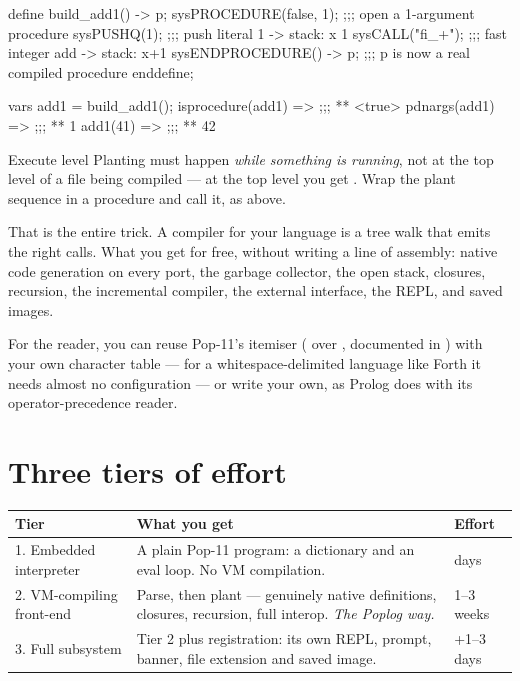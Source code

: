 \begin{pop}
define build_add1() -> p;
    sysPROCEDURE(false, 1);      ;;; open a 1-argument procedure
        sysPUSHQ(1);             ;;;   push literal 1    -> stack: x 1
        sysCALL("fi_+");         ;;;   fast integer add  -> stack: x+1
    sysENDPROCEDURE() -> p;      ;;; p is now a real compiled procedure
enddefine;

vars add1 = build_add1();
isprocedure(add1) =>          ;;; ** <true>
pdnargs(add1)     =>          ;;; ** 1
add1(41)          =>          ;;; ** 42
\end{pop}

\begin{callout}{Execute level}
Planting must happen \emph{while something is running}, not at the top level
of a file being compiled --- at the top level you get
. Wrap the plant sequence in a
procedure and call it, as above.
\end{callout}

That is the entire trick. A compiler for your language is a tree walk that
emits the right  calls. What you get for free, without writing
a line of assembly: native code generation on every port, the garbage
collector, the open stack, closures, recursion, the incremental compiler, the
external interface, the REPL, and saved images.

For the reader, you can reuse Pop-11's itemiser ( over
, documented in ) with your own character
table --- for a whitespace-delimited language like Forth it needs almost no
configuration --- or write your own, as Prolog does with its
operator-precedence reader.

\section{Three tiers of effort}

\begin{center}
\footnotesize
\begin{tabular}{p{3.1cm}p{7.4cm}l}
\toprule
\textbf{Tier} & \textbf{What you get} & \textbf{Effort}\\
\midrule
1. Embedded interpreter & A plain Pop-11 program: a dictionary and an eval loop. No VM compilation. & days\\
2. VM-compiling front-end & Parse, then plant --- genuinely native definitions, closures, recursion, full interop. \emph{The Poplog way.} & 1--3 weeks\\
3. Full subsystem & Tier 2 plus registration: its own REPL, prompt, banner, file extension and saved image. & +1--3 days\\
\bottomrule
\end{tabular}
\end{center}

